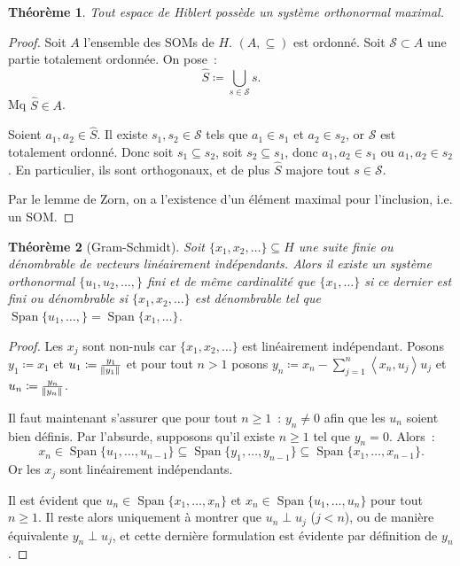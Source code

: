 \documentclass{report}
\DeclareMathOperator{\Span}{Span}
\newcommand{\scpr}[2]{\left\langle#1, #2\right\rangle}
\newtheorem{thm}{Théorème}[chapter]
\theoremstyle{definition}
\theoremstyle{remark}
\begin{document}
\begin{thm} Tout espace de Hiblert possède un système orthonormal maximal.
\end{thm}

\begin{proof} Soit $A$ l'ensemble des SOMs de $H$. $(A, \subseteq)$ est ordonné. Soit $\mathcal S \subset A$ une partie totalement ordonnée. On pose~:
\[\hat S \coloneqq \bigcup_{s \in \mathcal S}s.\]
Mq $\hat S \in A$.

Soient $a_1, a_2 \in \hat S$. Il existe $s_1, s_2 \in \mathcal S$ tels que $a_1 \in s_1$ et $a_2 \in s_2$, or $\mathcal S$ est totalement ordonné. Donc soit $s_1 \subseteq s_2$,
soit $s_2 \subseteq s_1$, donc $a_1, a_2 \in s_1$ ou $a_1, a_2 \in s_2$. En particulier, ils sont orthogonaux, et de plus $\hat S$ majore tout $s \in \mathcal S$.

Par le lemme de Zorn, on a l'existence d'un élément maximal pour l'inclusion, i.e. un SOM.
\end{proof}

\begin{thm}[Gram-Schmidt] Soit $\{x_1, x_2, \ldots\} \subseteq H$ une suite finie ou dénombrable de vecteurs linéairement indépendants. Alors il existe un système orthonormal
$\{u_1, u_2, \ldots,\}$ fini et de même cardinalité que $\{x_1, \ldots\}$ si ce dernier est fini ou dénombrable si $\{x_1, x_2, \ldots\}$ est dénombrable tel que
$\Span \{u_1, \ldots, \} = \Span \{x_1, \ldots\}$.
\end{thm}

\begin{proof} Les $x_j$ sont non-nuls car $\{x_1, x_2, \ldots\}$ est linéairement indépendant. Posons $y_1 \coloneqq x_1$ et $u_1 \coloneqq \frac {y_1}{\norm {y_1}}$ et pour tout $n > 1$
posons $y_n \coloneqq x_n - \sum_{j=1}^n\scpr {x_n}{u_j}u_j$ et $u_n \coloneqq \frac {y_n}{\norm {y_n}}$.

Il faut maintenant s'assurer que pour tout $n \geq 1$~: $y_n \neq 0$ afin que les $u_n$ soient bien définis. Par l'absurde, supposons qu'il existe $n \geq 1$ tel que $y_n = 0$. Alors~:
\[x_n \in \Span\{u_1, \ldots, u_{n-1}\} \subseteq \Span\{y_1, \ldots, y_{n-1}\} \subseteq \Span\{x_1, \ldots, x_{n-1}\}.\]
Or les $x_j$ sont linéairement indépendants.

Il est évident que $u_n \in \Span\{x_1, \ldots, x_n\}$ et $x_n \in \Span\{u_1, \ldots, u_n\}$ pour tout $n \geq 1$. Il reste alors uniquement à montrer que $u_n \perp u_j$ ($j < n$),
ou de manière équivalente $y_n \perp u_j$, et cette dernière formulation est évidente par définition de $y_n$.
\end{proof}
\end{document}
